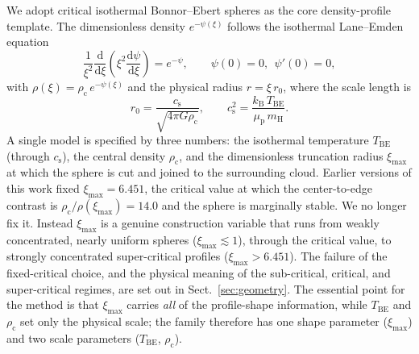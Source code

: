 \documentclass[11pt,a4paper]{article}
\newcommand{\rhoc}{\rho_{\mathrm{c}}}
\newcommand{\cs}{c_{\mathrm{s}}}
\newcommand{\rzero}{r_{0}}
\newcommand{\Tbe}{T_{\mathrm{BE}}}
\newcommand{\ximax}{\xi_{\mathrm{max}}}
\newcommand{\mH}{m_{\mathrm{H}}}
\begin{document}
We adopt critical isothermal Bonnor--Ebert spheres \citep{Ebert1955,Bonnor1956}
as the core density-profile template. The dimensionless density $e^{-\psi(\xi)}$ follows the
isothermal Lane--Emden equation
\begin{equation}
  \frac{1}{\xi^{2}}\frac{\mathrm{d}}{\mathrm{d}\xi}
  \!\left(\xi^{2}\frac{\mathrm{d}\psi}{\mathrm{d}\xi}\right)
  = e^{-\psi},
  \qquad \psi(0)=0,\ \ \psi'(0)=0,
  \label{eq:lane-emden}
\end{equation}
with $\rho(\xi)=\rhoc\,e^{-\psi(\xi)}$ and the physical radius
$r=\xi\,\rzero$, where the scale length is
\begin{equation}
  \rzero = \frac{\cs}{\sqrt{4\pi G \rhoc}},
  \qquad
  \cs^{2} = \frac{k_{\mathrm B}\,\Tbe}{\mu_{\mathrm p}\,\mH}.
  \label{eq:r0}
\end{equation}
A single model is specified by three numbers: the isothermal temperature
$\Tbe$ (through $\cs$), the central density $\rhoc$, and the dimensionless
truncation radius $\ximax$ at which the sphere is cut and joined to the
surrounding cloud. Earlier versions of this work fixed $\ximax = 6.451$, the
critical value at which the center-to-edge contrast is
$\rhoc/\rho(\ximax) = 14.0$ and the sphere is marginally stable. We no longer
fix it. Instead $\ximax$ is a genuine construction variable that runs from
weakly concentrated, nearly uniform spheres ($\ximax \lesssim 1$), through the
critical value, to strongly concentrated super-critical profiles
($\ximax > 6.451$). The failure of the fixed-critical choice, and the physical
meaning of the sub-critical, critical, and super-critical regimes, are set out
in Sect.~\ref{sec:geometry}. The essential point for the method is that
$\ximax$ carries \emph{all} of the profile-shape information, while $\Tbe$ and
$\rhoc$ set only the physical scale; the family therefore has one shape
parameter ($\ximax$) and two scale parameters ($\Tbe$, $\rhoc$).
\end{document}
